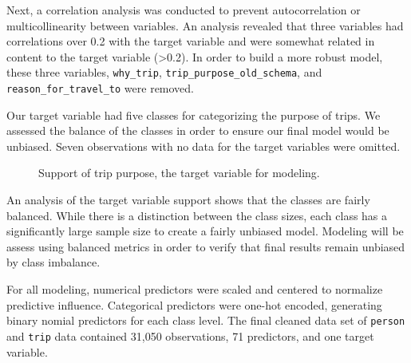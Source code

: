 \documentclass[
  article,
  nofooter]{jss}
\begin{document}
Next, a correlation analysis was conducted to prevent autocorrelation or
multicollinearity between variables. An analysis revealed that three
variables had correlations over 0.2 with the target variable and were
somewhat related in content to the target variable (\textgreater0.2). In
order to build a more robust model, these three variables,
\texttt{why\_trip}, \texttt{trip\_purpose\_old\_schema}, and
\texttt{reason\_for\_travel\_to} were removed.

Our target variable had five classes for categorizing the purpose of
trips. We assessed the balance of the classes in order to ensure our
final model would be unbiased. Seven observations with no data for the
target variables were omitted.

\begin{figure}


\caption{\label{fig-trip-purpose}Support of trip purpose, the target
variable for modeling.}

\end{figure}%

An analysis of the target variable support shows that the classes are
fairly balanced. While there is a distinction between the class sizes,
each class has a significantly large sample size to create a fairly
unbiased model. Modeling will be assess using balanced metrics in order
to verify that final results remain unbiased by class imbalance.

For all modeling, numerical predictors were scaled and centered to
normalize predictive influence. Categorical predictors were one-hot
encoded, generating binary nomial predictors for each class level. The
final cleaned data set of \texttt{person} and \texttt{trip} data
contained 31,050 observations, 71 predictors, and one target variable.
\end{document}
